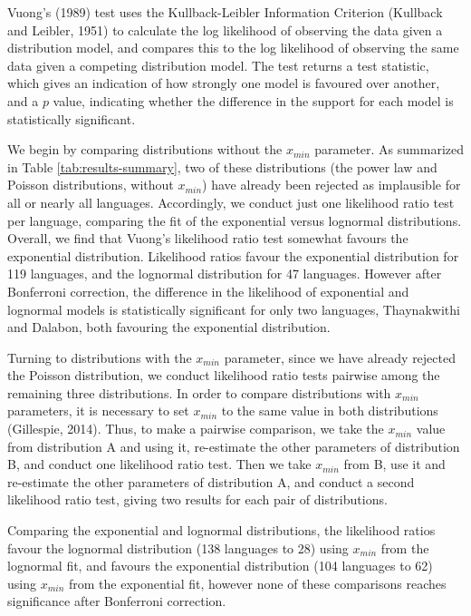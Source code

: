 Vuong's (1989) test uses the Kullback-Leibler Information Criterion (Kullback and Leibler, 1951) to calculate the log likelihood of observing the data given a distribution model, and compares this to the log likelihood of observing the same data given a competing distribution model. The test returns a test statistic, which gives an indication of how strongly one model is favoured over another, and a \(p\) value, indicating whether the difference in the support for each model is statistically significant.

We begin by comparing distributions without the \(x_{min}\) parameter. As summarized in Table \ref{tab:results-summary}, two of these distributions (the power law and Poisson distributions, without \(x_{min}\)) have already been rejected as implausible for all or nearly all languages. Accordingly, we conduct just one likelihood ratio test per language, comparing the fit of the exponential versus lognormal distributions. Overall, we find that Vuong's likelihood ratio test somewhat favours the exponential distribution. Likelihood ratios favour the exponential distribution for 119 languages, and the lognormal distribution for 47 languages. However after Bonferroni correction, the difference in the likelihood of exponential and lognormal models is statistically significant for only two languages, Thaynakwithi and Dalabon, both favouring the exponential distribution.

Turning to distributions with the \(x_{min}\) parameter, since we have already rejected the Poisson distribution, we conduct likelihood ratio tests pairwise among the remaining three distributions. In order to compare distributions with \(x_{min}\) parameters, it is necessary to set \(x_{min}\) to the same value in both distributions (Gillespie, 2014). Thus, to make a pairwise comparison, we take the \(x_{min}\) value from distribution A and using it, re-estimate the other parameters of distribution B, and conduct one likelihood ratio test. Then we take \(x_{min}\) from B, use it and re-estimate the other parameters of distribution A, and conduct a second likelihood ratio test, giving two results for each pair of distributions.

Comparing the exponential and lognormal distributions, the likelihood ratios favour the lognormal distribution (138 languages to 28) using \(x_{min}\) from the lognormal fit, and favours the exponential distribution (104 languages to 62) using \(x_{min}\) from the exponential fit, however none of these comparisons reaches significance after Bonferroni correction.

